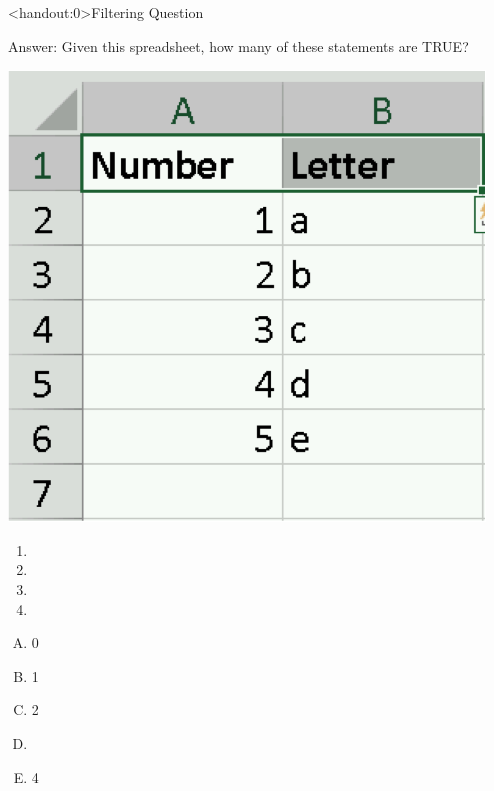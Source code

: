 \documentclass[xcolor=svgnames]{beamer}
\begin{document}
\begin{frame}<handout:0>{Filtering Question}
  \begin{block}{Answer:}
 Given this spreadsheet, how many of these statements are TRUE?
  \vspace{-7mm}
 \begin{center}
    \includegraphics[height=.4\textheight]{FilteringQ}
 \end{center}
 \vspace{-1em}
\begin{enumerate}
\item {}
\item {}
\item {}
\item {}
\end{enumerate}
\vspace{-5mm}
\begin{multicols}{5}
\begin{enumerate}[A)]
\item 0 
\item 1
\item 2
\item \textbf<5>{\textit<5>{{}}}
\item 4
\end{enumerate}
\end{multicols}
  \end{block} 
\end{frame}
\end{document}
